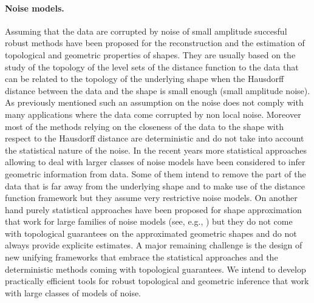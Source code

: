 \paragraph{Noise models.}
Assuming that the data are corrupted by noise of small amplitude succesful robust methods have been proposed for the reconstruction and the estimation of topological and geometric  properties of shapes. They are usually based on the study of the topology of the level sets of the distance function to the data that can be related to the topology of the underlying shape when the Hausdorff distance  between the data and the shape is small enough (small amplitude noise). As previously mentioned such an assumption on the noise does not comply with many applications where the data come corrupted by non local noise. Moreover most of the methods relying on the closeness of the data to the shape with respect to the Hausdorff distance are deterministic and do not take into account the statistical nature of the noise.  
In the recent years more statistical approaches allowing to deal with larger classes of noise models have been considered to infer geometric information from data. Some of them intend to remove the part of the data that is far away from the underlying shape and to make use of  the distance function framework \cite{nsw-tvu-2011} but they assume very restrictive noise models. On another hand purely statistical approaches have been proposed for shape approximation that work for large families of noise models (see, e.g., \cite{gpvw-mme-2011,gpvw-mesd-2011}) but they do not come with topological guarantees on the approximated geometric shapes and do not always provide explicite estimates. A major remaining challenge is the design of new unifying frameworks that embrace the statistical approaches and the deterministic methods coming with topological guarantees.  We intend to develop practically efficient tools for robust topological and geometric inference that work with large classes of models of noise. 


